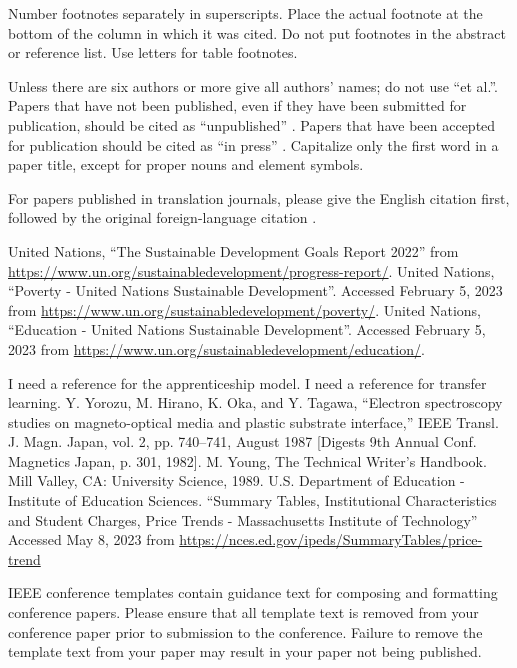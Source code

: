 \documentclass[journal, onecolumn]{IEEEtran}
\begin{document}
Number footnotes separately in superscripts. Place the actual footnote at 
the bottom of the column in which it was cited. Do not put footnotes in the 
abstract or reference list. Use letters for table footnotes.

Unless there are six authors or more give all authors' names; do not use 
``et al.''. Papers that have not been published, even if they have been 
submitted for publication, should be cited as ``unpublished'' \cite{b4}. Papers 
that have been accepted for publication should be cited as ``in press'' \cite{b5}. 
Capitalize only the first word in a paper title, except for proper nouns and 
element symbols.

For papers published in translation journals, please give the English 
citation first, followed by the original foreign-language citation \cite{b6}.

\begin{thebibliography}{00}
   United Nations, ``The Sustainable Development Goals Report 2022'' from \url{https://www.un.org/sustainabledevelopment/progress-report/}.
   United Nations, ``Poverty - United Nations Sustainable Development''. Accessed February 5, 2023 from \url{https://www.un.org/sustainabledevelopment/poverty/}.
   United Nations, ``Education - United Nations Sustainable Development''. Accessed February 5, 2023 from \url{https://www.un.org/sustainabledevelopment/education/}.

  
 I need a reference for the apprenticeship model.
 I need a reference for transfer learning.
 Y. Yorozu, M. Hirano, K. Oka, and Y. Tagawa, ``Electron spectroscopy studies on magneto-optical media and plastic substrate interface,'' IEEE Transl. J. Magn. Japan, vol. 2, pp. 740--741, August 1987 [Digests 9th Annual Conf. Magnetics Japan, p. 301, 1982].
 M. Young, The Technical Writer's Handbook. Mill Valley, CA: University Science, 1989.
 U.S. Department of Education - Institute of Education Sciences. ``Summary Tables, Institutional Characteristics and Student Charges, Price Trends - Massachusetts Institute of Technology'' Accessed May 8, 2023 from \url{https://nces.ed.gov/ipeds/SummaryTables/price-trend}
\end{thebibliography}
\vspace{12pt}
\color{red}
IEEE conference templates contain guidance text for composing and formatting conference papers. Please ensure that all template text is removed from your conference paper prior to submission to the conference. Failure to remove the template text from your paper may result in your paper not being published.
\end{document}
